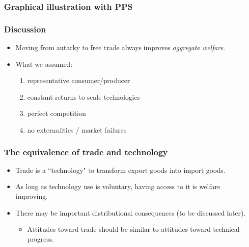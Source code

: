 \documentclass[compress,mathserif,aspectratio=169]{beamer}
\begin{document}
\begin{frame}\frametitle{Graphical illustration with PPS}\hypertarget{Graphical illustration with PPS}{}


\end{frame}



\begin{frame}\frametitle{Discussion}\hypertarget{Discussion}{}
\begin{itemize}
\item Moving from autarky to free trade always improves \emph{aggregate welfare}.

\item What we assumed:
\begin{enumerate}\setcounter{enumi}{0}
\item representative consumer/producer

\item constant returns to scale technologies

\item perfect competition

\item no externalities / market failures


\end{enumerate}

\end{itemize}
\end{frame}



\begin{frame}\frametitle{The equivalence of trade and technology}\hypertarget{The equivalence of trade and technology}{}
\begin{itemize}
\item Trade is a ``technology" to transform export goods into import goods.

\item As long as technology use is voluntary, having access to it is welfare improving.

\item There may be important distributional consequences (to be discussed later).
\begin{itemize}
\item Attitudes toward trade should be similar to attitudes toward technical progress.


\end{itemize}

\end{itemize}
\end{frame}
\end{document}
